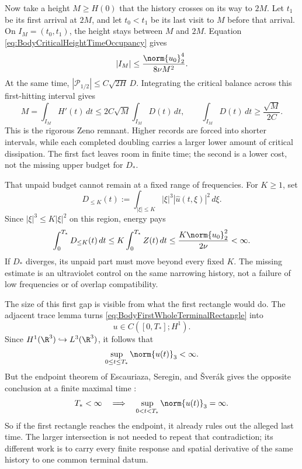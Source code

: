 Now take a height \(M\geq H(0)\) that the history crosses on its way to
\(2M\).  Let \(t_1\) be its first arrival at \(2M\), and let \(t_0<t_1\) be
its last visit to \(M\) before that arrival.  On
\(I_M=(t_0,t_1)\), the height stays between \(M\) and \(2M\).  Equation
\eqref{eq:BodyCriticalHeightTimeOccupancy} gives
\begin{equation}\label{eq:BodyCriticalDoublingIntervalLength}
  |I_M|
  \leq\frac{\norm{u_0}_2^4}{8\nu M^2}.
\end{equation}
At the same time,
\(|\mathcal P_{1/2}|\leq C\sqrt{2H}\,D\).  Integrating the critical balance
across this first-hitting interval gives
\begin{equation}\label{eq:BodyCriticalDoublingDissipationCost}
  M
  =\int_{I_M}H'(t)\,dt
  \leq2C\sqrt M\int_{I_M}D(t)\,dt,
  \qquad
  \int_{I_M}D(t)\,dt\geq\frac{\sqrt M}{2C}.
\end{equation}
This is the rigorous Zeno remnant.  Higher records are forced into shorter
intervals, while each completed doubling carries a larger lower amount of
critical dissipation.  The first fact leaves room in finite time; the second is
a lower cost, not the missing upper budget for \(D_*\).

That unpaid budget cannot remain at a fixed range of frequencies.  For
\(K\geq1\), set
\[
  D_{\leq K}(t)
  :=\int_{|\xi|\leq K}|\xi|^3|\widehat u(t,\xi)|^2\,d\xi.
\]
Since \(|\xi|^3\leq K|\xi|^2\) on this region, energy pays
\begin{equation}\label{eq:BodyFixedFrequencyCriticalDissipation}
  \int_0^{T_*}D_{\leq K}(t)\,dt
  \leq K\int_0^{T_*}Z(t)\,dt
  \leq\frac{K\norm{u_0}_2^2}{2\nu}<\infty.
\end{equation}
If \(D_*\) diverges, its unpaid part must move beyond every fixed \(K\).
The missing estimate is an ultraviolet control on the same narrowing history,
not a failure of low frequencies or of overlap compatibility.

The size of this first gap is visible from what the first rectangle would do.
The adjacent trace lemma turns \eqref{eq:BodyFirstWholeTerminalRectangle} into
\[
  u\in C([0,T_*];H^1).
\]
Since \(H^1(\R^3)\hookrightarrow L^3(\R^3)\), it follows that
\begin{equation}\label{eq:EndpointCriterionFromLowRectangle}
  \sup_{0\leq t\leq T_*}\norm{u(t)}_3<\infty.
\end{equation}
But the endpoint theorem of Escauriaza, Seregin, and \v{S}ver\'ak gives the
opposite conclusion at a finite maximal time
\parencite{EscauriazaSereginSverak2003}:
\begin{equation}\label{eq:FiniteTimeLThreeEscape}
  T_*<\infty
  \quad\Longrightarrow\quad
  \sup_{0<t<T_*}\norm{u(t)}_3=\infty.
\end{equation}
So if the first rectangle reaches the endpoint, it already rules out the
alleged last time.  The larger intersection is not needed to repeat that
contradiction; its different work is to carry every finite response and spatial
derivative of the same history to one common terminal datum.

